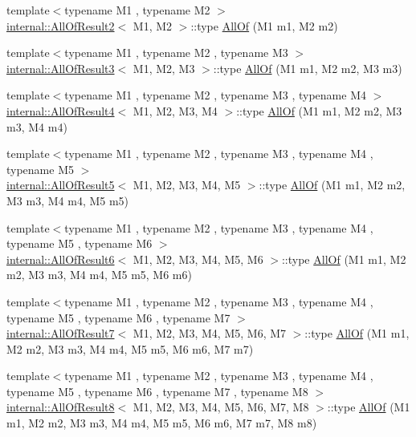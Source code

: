 \begin{DoxyCompactItemize}
\item 
{\footnotesize template$<$typename M1 , typename M2 $>$ }\\\mbox{\hyperlink{structtesting_1_1internal_1_1AllOfResult2}{internal\+::\+All\+Of\+Result2}}$<$ M1, M2 $>$\+::type \mbox{\hyperlink{namespacetesting_af7618e8606c1cb45738163688944e2b7}{All\+Of}} (M1 m1, M2 m2)
\item 
{\footnotesize template$<$typename M1 , typename M2 , typename M3 $>$ }\\\mbox{\hyperlink{structtesting_1_1internal_1_1AllOfResult3}{internal\+::\+All\+Of\+Result3}}$<$ M1, M2, M3 $>$\+::type \mbox{\hyperlink{namespacetesting_a75934d8ea6b986d2157a5ebfe68f9904}{All\+Of}} (M1 m1, M2 m2, M3 m3)
\item 
{\footnotesize template$<$typename M1 , typename M2 , typename M3 , typename M4 $>$ }\\\mbox{\hyperlink{structtesting_1_1internal_1_1AllOfResult4}{internal\+::\+All\+Of\+Result4}}$<$ M1, M2, M3, M4 $>$\+::type \mbox{\hyperlink{namespacetesting_a4a9a119cde16e43b364f3573136857a1}{All\+Of}} (M1 m1, M2 m2, M3 m3, M4 m4)
\item 
{\footnotesize template$<$typename M1 , typename M2 , typename M3 , typename M4 , typename M5 $>$ }\\\mbox{\hyperlink{structtesting_1_1internal_1_1AllOfResult5}{internal\+::\+All\+Of\+Result5}}$<$ M1, M2, M3, M4, M5 $>$\+::type \mbox{\hyperlink{namespacetesting_ab8f5e6cf1c22acf51a2b9b376b0ef03a}{All\+Of}} (M1 m1, M2 m2, M3 m3, M4 m4, M5 m5)
\item 
{\footnotesize template$<$typename M1 , typename M2 , typename M3 , typename M4 , typename M5 , typename M6 $>$ }\\\mbox{\hyperlink{structtesting_1_1internal_1_1AllOfResult6}{internal\+::\+All\+Of\+Result6}}$<$ M1, M2, M3, M4, M5, M6 $>$\+::type \mbox{\hyperlink{namespacetesting_afc8e2d405f80e7d3df32842ddb648125}{All\+Of}} (M1 m1, M2 m2, M3 m3, M4 m4, M5 m5, M6 m6)
\item 
{\footnotesize template$<$typename M1 , typename M2 , typename M3 , typename M4 , typename M5 , typename M6 , typename M7 $>$ }\\\mbox{\hyperlink{structtesting_1_1internal_1_1AllOfResult7}{internal\+::\+All\+Of\+Result7}}$<$ M1, M2, M3, M4, M5, M6, M7 $>$\+::type \mbox{\hyperlink{namespacetesting_acbd4eef50126ff6db5b93ac5faa71b45}{All\+Of}} (M1 m1, M2 m2, M3 m3, M4 m4, M5 m5, M6 m6, M7 m7)
\item 
{\footnotesize template$<$typename M1 , typename M2 , typename M3 , typename M4 , typename M5 , typename M6 , typename M7 , typename M8 $>$ }\\\mbox{\hyperlink{structtesting_1_1internal_1_1AllOfResult8}{internal\+::\+All\+Of\+Result8}}$<$ M1, M2, M3, M4, M5, M6, M7, M8 $>$\+::type \mbox{\hyperlink{namespacetesting_a7ec0bc4eca9805e85b9b34bbbf3d3ae2}{All\+Of}} (M1 m1, M2 m2, M3 m3, M4 m4, M5 m5, M6 m6, M7 m7, M8 m8)

\end{DoxyCompactItemize}
